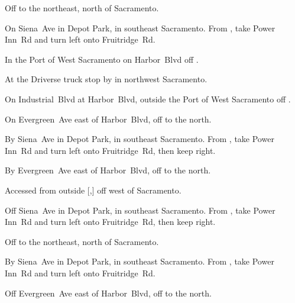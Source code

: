 
\begin{LocationList}

Off   to the northeast, north of Sacramento.

On Siena~Ave in Depot Park, in southeast Sacramento.
From , take  Power Inn~Rd and turn left onto Fruitridge~Rd.

In the Port of West Sacramento on Harbor~Blvd off .

At the Driverse truck stop by   in northwest Sacramento.

On Industrial~Blvd at Harbor~Blvd, outside the Port of West Sacramento off .

\Location{\GarageHQ \Garage}
On Evergreen~Ave east of Harbor~Blvd, off  to the north.

By Siena~Ave in Depot Park, in southeast Sacramento.
From , take  Power Inn~Rd and turn left onto Fruitridge~Rd, then keep right.

By Evergreen~Ave east of Harbor~Blvd, off  to the north.

Accessed from  outside [,] off  west of Sacramento.

Off Siena~Ave in Depot Park, in southeast Sacramento.
From , take  Power Inn~Rd and turn left onto Fruitridge~Rd, then keep right.

Off   to the northeast, north of Sacramento.

By Siena~Ave in Depot Park, in southeast Sacramento.
From , take  Power Inn~Rd and turn left onto Fruitridge~Rd.

Off Evergreen~Ave east of Harbor~Blvd, off  to the north.

\end{LocationList}
